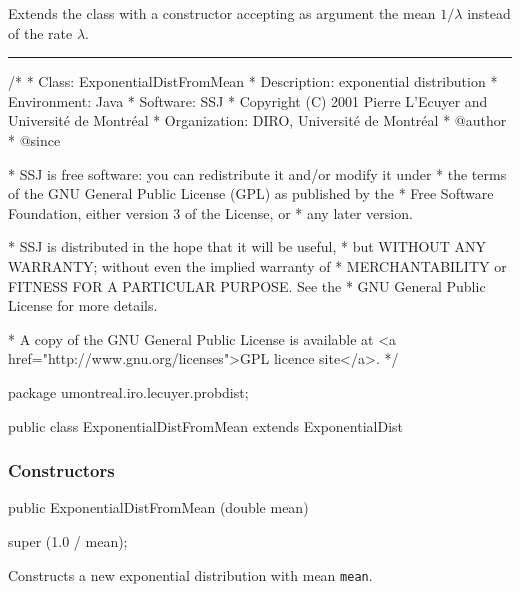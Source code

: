 
Extends the  class with a constructor accepting as
argument the mean $1/\lambda$ instead of the rate $\lambda$.

\bigskip\hrule\bigskip

\begin{code}
\begin{hide}
/*
 * Class:        ExponentialDistFromMean
 * Description:  exponential distribution
 * Environment:  Java
 * Software:     SSJ 
 * Copyright (C) 2001  Pierre L'Ecuyer and Université de Montréal
 * Organization: DIRO, Université de Montréal
 * @author       
 * @since

 * SSJ is free software: you can redistribute it and/or modify it under
 * the terms of the GNU General Public License (GPL) as published by the
 * Free Software Foundation, either version 3 of the License, or
 * any later version.

 * SSJ is distributed in the hope that it will be useful,
 * but WITHOUT ANY WARRANTY; without even the implied warranty of
 * MERCHANTABILITY or FITNESS FOR A PARTICULAR PURPOSE.  See the
 * GNU General Public License for more details.

 * A copy of the GNU General Public License is available at
   <a href="http://www.gnu.org/licenses">GPL licence site</a>.
 */
\end{hide}
package umontreal.iro.lecuyer.probdist;

public class ExponentialDistFromMean extends ExponentialDist\begin{hide} {
\end{hide}
\end{code}


\subsubsection* {Constructors}

\begin{code}

   public ExponentialDistFromMean (double mean)\begin{hide} {
      super (1.0 / mean);
   }\end{hide}
\end{code}
\begin{tabb} Constructs a new exponential distribution with mean \texttt{mean}.
\end{tabb}
\begin{htmlonly}
\end{htmlonly}


